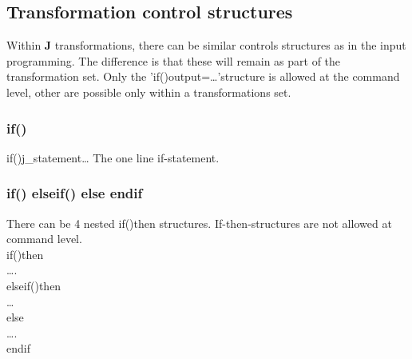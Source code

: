 \subsection{Transformation control structures}
\label{transcont}
Within \textbf{J} transformations, there can be similar controls structures as in the input programming.
The  difference  is  that  these  will  remain  as  part  of  the  transformation  set.  Only  the
'\textcolor{VioletRed}{if}()output=…'structure is allowed at the command level, other are possible only within a
transformations set.
\subsubsection{\textcolor{VioletRed}{if}()}
\label{if}
\textcolor{VioletRed}{if}()j\_statement… \newline
The one line if-statement.
\subsubsection{\textcolor{VioletRed}{if}() elseif() else endif}
\label{ifthen}
There can be 4 nested \textcolor{VioletRed}{if}()then structures. If-then-structures are not
allowed at command level.
\\
\textcolor{VioletRed}{if}()then
\\
….
\\
elseif()then
\\
…
\\
else
\\
….
\\
endif
\\

